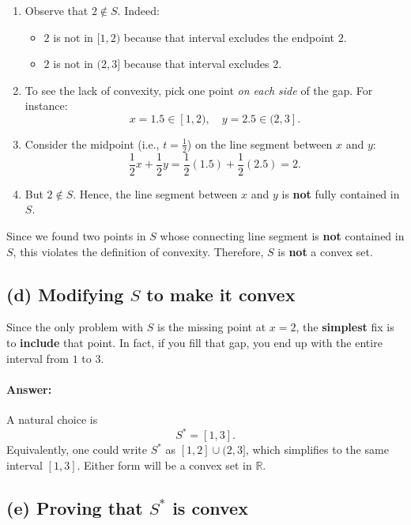 \documentclass[12pt]{article}
\begin{document}
\begin{enumerate}
    \item Observe that \(2 \notin S\). Indeed:
    \begin{itemize}
        \item \(2\) is not in \([1,2)\) because that interval excludes the endpoint \(2\).
        \item \(2\) is not in \((2,3]\) because that interval excludes \(2\).
    \end{itemize}
    \item To see the lack of convexity, pick one point \textit{on each side} of the gap. For instance:
    \[
    x = 1.5 \in [1,2), \quad y = 2.5 \in (2,3].
    \]
    \item Consider the midpoint (i.e., \(t = \frac{1}{2}\)) on the line segment between \(x\) and \(y\):
    \[
    \frac{1}{2}x + \frac{1}{2}y = \frac{1}{2}(1.5) + \frac{1}{2}(2.5) = 2.
    \]
    \item But \(2 \notin S\). Hence, the line segment between \(x\) and \(y\) is \textbf{not} fully contained in \(S\).
\end{enumerate}

Since we found two points in \(S\) whose connecting line segment is \textbf{not} contained in \(S\), this violates the definition of convexity. Therefore, \(S\) is \textbf{not} a convex set.

\bigskip
\newpage
\subsection*{(d) Modifying \(S\) to make it convex}

Since the only problem with \(S\) is the missing point at \(x = 2\), the \textbf{simplest} fix is to \textbf{include} that point. In fact, if you fill that gap, you end up with the entire interval from \(1\) to \(3\).

\paragraph{Answer:} A natural choice is
\[
S^* = [1, 3].
\]
Equivalently, one could write \(S^*\) as \([1,2] \cup (2,3]\), which simplifies to the same interval \([1,3]\). Either form will be a convex set in \(\mathbb{R}\).

\bigskip
\newpage
\subsection*{(e) Proving that \(S^*\) is convex}
\end{document}
